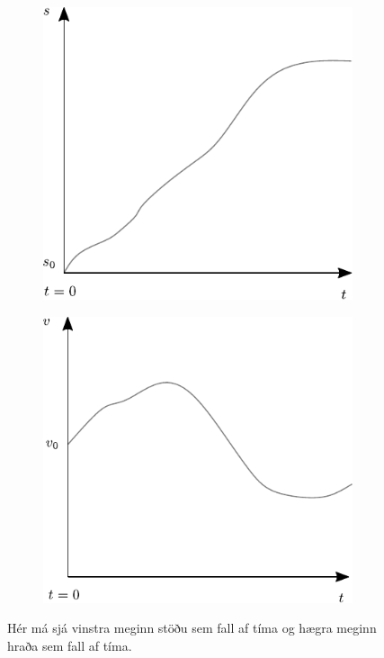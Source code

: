 \ifdefined \wholebook \else\documentclass[oneside]{book}\usepackage{EdlBook}\graphicspath{{figures/}}
\begin{document}
\begin{figure}[H]
    \centering
\begin{subfigure}[h]{0.4\textwidth}
    \centering
    \includegraphics[width=\linewidth]{figures/stodutimagraf.pdf}
    \label{fig:stgraph}
\end{subfigure}
\hfill
\begin{subfigure}[h]{0.4\textwidth}
    \centering
    \includegraphics[width=\linewidth]{figures/hradatimagraf.pdf}
    \label{fig:vtgraph}
\end{subfigure}
\caption{Hér má sjá vinstra meginn stöðu sem fall af tíma og hægra meginn hraða sem fall af tíma.}
\end{figure}
\end{document}
